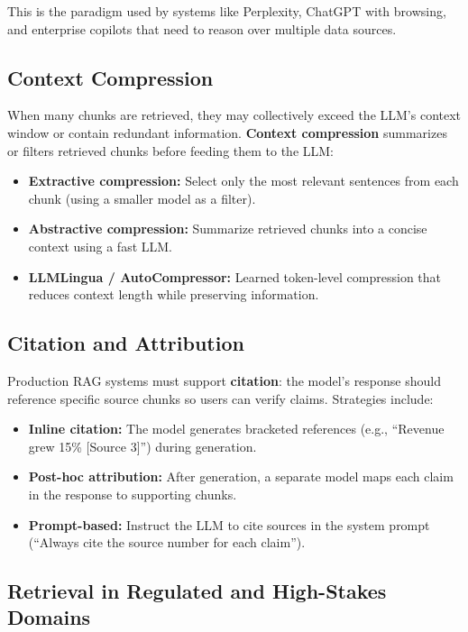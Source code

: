 This is the paradigm used by systems like Perplexity, ChatGPT with browsing,
and enterprise copilots that need to reason over multiple data sources.

\subsection{Context Compression}

When many chunks are retrieved, they may collectively exceed the LLM's context
window or contain redundant information.  \textbf{Context compression}
summarizes or filters retrieved chunks before feeding them to the LLM:
\begin{itemize}
    \item \textbf{Extractive compression:} Select only the most relevant
          sentences from each chunk (using a smaller model as a filter).
    \item \textbf{Abstractive compression:} Summarize retrieved chunks into a
          concise context using a fast LLM.
    \item \textbf{LLMLingua / AutoCompressor:} Learned token-level compression
          that reduces context length while preserving information.
\end{itemize}

\subsection{Citation and Attribution}

Production RAG systems must support \textbf{citation}: the model's response
should reference specific source chunks so users can verify claims.  Strategies
include:
\begin{itemize}
    \item \textbf{Inline citation:} The model generates bracketed references
          (e.g., ``Revenue grew 15\% [Source 3]'') during generation.
    \item \textbf{Post-hoc attribution:} After generation, a separate model
          maps each claim in the response to supporting chunks.
    \item \textbf{Prompt-based:} Instruct the LLM to cite sources in the system
          prompt (``Always cite the source number for each claim'').
\end{itemize}

\subsection{Retrieval in Regulated and High-Stakes Domains}
\label{sec:high-stakes-rag}

